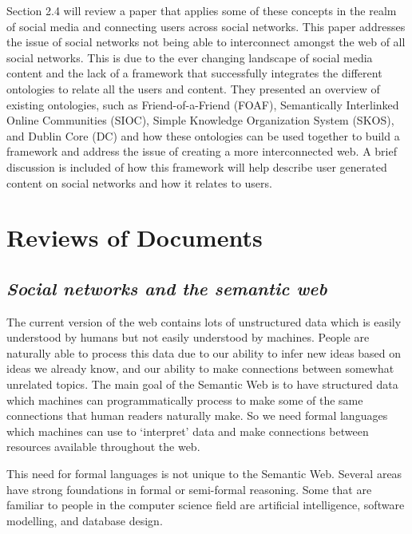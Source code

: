 \documentclass[10pt,journal,compsoc]{IEEEtran}
\begin{document}
Section 2.4 will review a paper that applies some of these concepts in the realm of social media and connecting users across social networks. This paper addresses the issue of social networks not being able to interconnect amongst the web of all social networks. This is due to the ever changing landscape of social media content and the lack of a framework that successfully integrates the different ontologies to relate all the users and content. They presented an overview of existing ontologies, such as Friend-of-a-Friend (FOAF), Semantically Interlinked Online Communities (SIOC), Simple Knowledge Organization System (SKOS), and Dublin Core (DC) and how these ontologies can be used together to build a framework and address the issue of creating a more interconnected web. A brief discussion is included of how this framework will help describe user generated content on social networks and how it relates to users.



\section{Reviews of Documents}
\subsection{\textit{Social networks and the semantic web} \cite{_social_2007}}
The current version of the web contains lots of unstructured data which is easily understood by humans but not easily understood by machines.  People are naturally able to process this data due to our ability to infer new ideas based on ideas we already know, and our ability to make connections between somewhat unrelated topics.  The main goal of the Semantic Web is to have structured data which machines can programmatically  process  to make some of the same connections that human readers naturally make.  So we need formal languages which machines can use to ‘interpret’ data and make connections between resources available throughout the web.

This need for formal languages is not unique to the Semantic Web.  Several areas have strong foundations in formal or semi-formal reasoning.  Some that are familiar to people in the computer science field are artificial intelligence, software modelling, and  database design.
\end{document}

